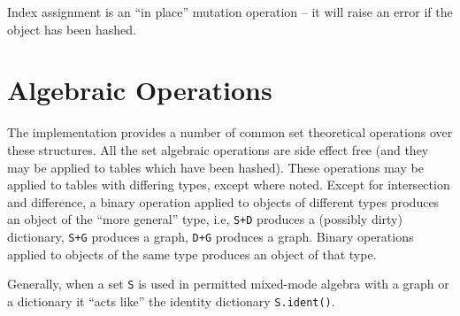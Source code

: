 Index assignment is an ``in place'' mutation operation -- it will raise an
error if the object has been hashed.

\section{Algebraic Operations}

The implementation provides a number of common set theoretical
operations over these structures.  All the set algebraic operations
are side effect free (and they may be applied to tables which have
been hashed).  These operations may be applied to tables with
differing types, except where noted.  
Except for
intersection and difference, a binary operation applied to objects
of different types produces an object of the ``more general'' type,
i.e, 
{\tt S+D} produces a (possibly dirty) dictionary,
{\tt S+G} produces a graph,
{\tt D+G} produces a graph.
Binary operations applied to objects of the same type produces
an object of that type.

Generally, when a set {\tt S}
is used in permitted mixed-mode algebra with a graph or a dictionary it
``acts like'' the identity dictionary {\tt S.ident()}.  

